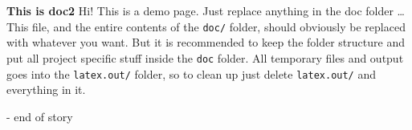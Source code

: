 \documentclass[12pt,a4paper]{report}
\begin{document}
\begin{center}
    \Huge{\textbf{This is doc2}}
    \break{}
    \huge{Hi! This is a demo page. Just replace anything in the doc folder \ldots}
    \break{}
    \normalsize
    This file, and the entire contents of the \texttt{doc/} folder, should obviously be replaced with whatever you want. But it is recommended to keep the folder structure and put all project specific stuff inside the \texttt{doc} folder. All temporary files and output goes into the \texttt{latex.out/} folder, so to clean up just delete \texttt{latex.out/} and everything in it.
    \vfill
    \vspace{20mm}
    
    \vspace{20mm}
    
    \vspace{20mm}
    \break{}
    \huge{- end of story}
    \vfill
\end{center}
\end{document}
